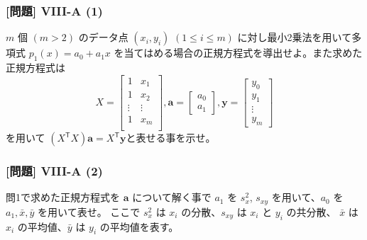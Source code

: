 \documentclass[dvipdfmx,aspectratio=169,20pt]{beamer}
\newcommand{\myfontsetting}[3]{{\fontsize{#1}{#2}\selectfont #3}}
\begin{document}
\begin{frame}

\frametitle{[問題] V\hspace{-.1em}I\hspace{-.1em}I\hspace{-.1em}I-A (1)}
\myfontsetting{15pt}{20pt}{
$m$ 個 $(m>2)$ のデータ点 $(x_i, y_i)$ $(1\le i\le m)$ に対し最小2乗法を用いて多項式 $p_1(x)=a_0 + a_1 x$ を当てはめる場合の正規方程式を導出せよ。また求めた正規方程式は
\myfontsetting{15pt}{15pt}{
\begin{equation*}
    X = \begin{bmatrix}
    1 & x_1\\
    1 & x_2\\
    \vdots & \vdots\\
    1 & x_m\\
    \end{bmatrix}, \bm{a} = \begin{bmatrix}
        a_0\\a_1
    \end{bmatrix}, 
    \bm{y} = \begin{bmatrix}
        y_0\\y_1\\ \vdots \\y_m
        \end{bmatrix}
\end{equation*}
}
を用いて $(X^\mathsf{T}X) \bm{a} = X^\mathsf{T} \bm{y}$と表せる事を示せ。%
}
\end{frame}
\begin{frame}
\frametitle{[問題] V\hspace{-.1em}I\hspace{-.1em}I\hspace{-.1em}I-A (2)}
\myfontsetting{18pt}{21pt}{
問1で求めた正規方程式を $\bm{a}$ について解く事で $a_1$ を $s_x^2$, $s_{xy}$ を用いて、$a_0$ を $a_1, \bar{x},\bar{y}$ を用いて表せ。
ここで $s_x^2$ は $x_i$ の分散、$s_{xy}$ は $x_i$ と $y_i$ の共分散、 $\bar{x}$ は $x_i$ の平均値、$\bar{y}$ は $y_i$ の平均値を表す。%
}
\end{frame}
\end{document}
